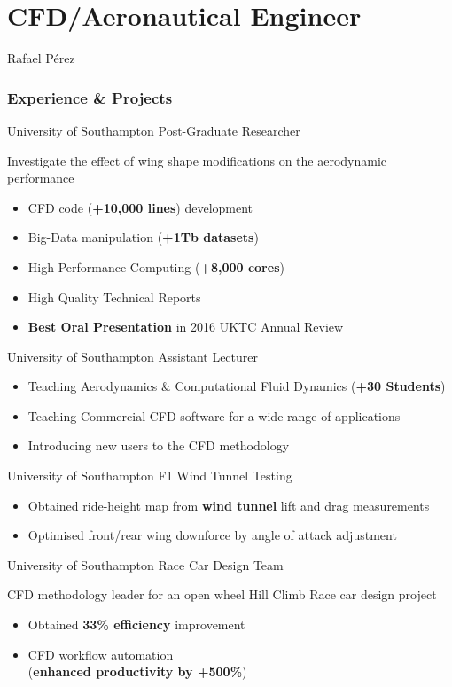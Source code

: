 \documentclass[fontsize=10pt]{tccv}
\begin{document}
\part{CFD/Aeronautical Engineer}{Rafael P\'erez}

\section{Experience \& Projects}
\begin{eventlist}
     {University of Southampton}
     {Post-Graduate Researcher}

Investigate the effect of wing shape modifications on
the aerodynamic performance
\begin{itemize}
	\itemsep -2pt
	\item CFD code (\textbf{+10,000 lines}) development
	\item Big-Data manipulation (\textbf{+1Tb datasets})
	\item High Performance Computing (\textbf{+8,000 cores})
	\item High Quality Technical Reports
	\item \textbf{Best Oral Presentation} in 2016 UKTC Annual Review
\end{itemize}

	{University of Southampton}
	{Assistant Lecturer}
\begin{itemize}
	\itemsep -2pt
	\item Teaching Aerodynamics \& Computational Fluid Dynamics (\textbf{+30 Students})
	\item Teaching Commercial CFD software for a wide range of applications
	\item Introducing new users to the CFD methodology
\end{itemize}

     {University of Southampton}
     {F1 Wind Tunnel Testing}
     \begin{itemize}
	\itemsep -2pt
     	\item Obtained ride-height map from \textbf{wind tunnel} lift and drag measurements
     	\item Optimised front/rear wing downforce by angle of attack adjustment
     \end{itemize}

     {University of Southampton}
     {Race Car Design Team}

CFD methodology leader for an open wheel Hill Climb Race car design project
     \begin{itemize}
	\itemsep -2pt
     	\item Obtained \textbf{33\% efficiency} improvement
     	\item CFD workflow automation \\(\textbf{enhanced productivity by +500\%})
     \end{itemize}


\end{eventlist}
\end{document}
